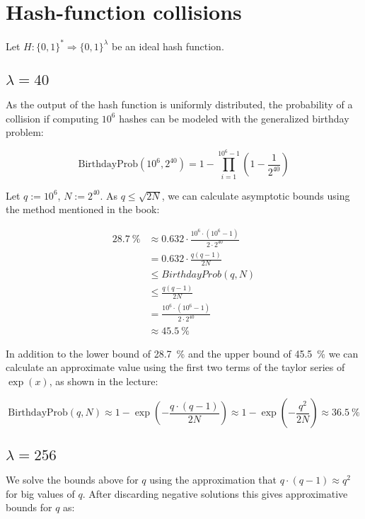 \documentclass[a4paper]{scrreprt}
\begin{document}
\section{Hash-function collisions}

Let $H: \{0, 1\}^{*} \Rightarrow \{0, 1\}^\lambda$ be an ideal hash function.

\subsection{$\lambda = 40$}

As the output of the hash function is uniformly distributed, the probability of
a collision if computing $10^6$ hashes can be modeled with the generalized
birthday problem:

\[
	\text{BirthdayProb}(10^6, 2^{40}) = 1 - \prod_{i = 1}^{10^6 - 1} \left(1 - \frac{1}{2^{40}}\right)
\]

Let $q := 10^6$, $N := 2^{40}$. As $q \leq \sqrt{2 N}$, we can calculate
asymptotic bounds using the method mentioned in the book:

\begin{align*}
	\SI{28.7}{\percent} & \approx 0.632 \cdot \frac{10^6 \cdot (10^6 - 1)}{2 \cdot 2^{40}} \\
			    & = 0.632 \cdot \frac{q (q-1)}{2N}  \\
			    & \leq BirthdayProb(q, N) \\ 
			    & \leq \frac{q (q-1)}{2N}  \\
			    & = \frac{10^6 \cdot (10^6 - 1)}{2 \cdot 2^{40}} \\
			    & \approx \SI{45.5}{\percent}
\end{align*}

In addition to the lower bound of \SI{28.7}{\percent} and the upper bound of
\SI{45.5}{\percent} we can calculate an approximate value using the first two
terms of the taylor series of $\exp(x)$, as shown in the lecture:

\[
	\text{BirthdayProb}(q, N) \approx 1 - \exp(-\frac{q \cdot (q - 1)}{2
	N}) \approx 1 - \exp(-\frac{q^2}{2 N}) \approx \SI{36.5}{\percent}
\]

\subsection{$\lambda = 256$}

We solve the bounds above for $q$ using the approximation that $q \cdot (q-1)
\approx q^2$ for big values of $q$. After discarding negative solutions this
gives approximative bounds for $q$ as:
\end{document}
